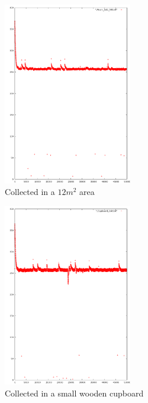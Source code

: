 \documentclass[10pt,a4paper]{article}
\begin{document}
\begin{figure}[H!]
  \caption{Collected in a $12m^2$ area}
  \centering
  \includegraphics[width=0.5\textwidth]{img/Bedroom50kFull.png}
\end{figure}

\begin{figure}[H!]
  \caption{Collected in a small wooden cupboard}
  \centering
  \includegraphics[width=0.5\textwidth]{img/Cupboard50kFull.png}
\end{figure}
\end{document}
